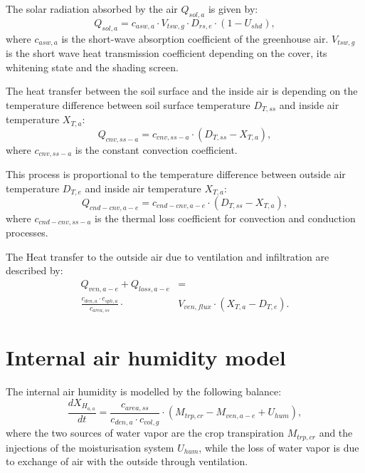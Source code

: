 The solar radiation absorbed by the air $Q_{sol,a}$ is given by:
\begin{equation}\label{eq:rs}
Q_{sol,a} = c_{asw,a} \cdot V_{tsw,g} \cdot D_{rs,e} \cdot \left( 1 - U_{shd} \right),
\end{equation}
where $c_{asw,a}$ is the short-wave absorption coefficient of the greenhouse air. $V_{tsw,g}$ is the short wave heat transmission coefficient depending on the cover, its whitening state and the shading screen.

The heat transfer between the soil surface and the inside air is depending on the temperature difference between soil surface temperature $D_{T,ss}$ and inside air temperature $X_{T,a}$:
\begin{equation}\label{eq:ss}
Q_{cnv,ss-a} = c_{cnv,ss-a} \cdot (D_{T,ss}-X_{T,a}),
\end{equation}
where $c_{cnv,ss-a}$ is the constant convection coefficient.

This process is proportional to the temperature difference between outside air temperature $D_{T,e}$ and inside air temperature $X_{T,a}$:
\begin{equation}\label{eq:a-e}
Q_{cnd-cnv,a-e} = c_{cnd-cnv,a-e} \cdot (D_{T,ss}-X_{T,a}),
\end{equation}
where $c_{cnd-cnv,ss-a}$ is the thermal loss coefficient for convection and conduction processes.

The Heat transfer to the outside air due to ventilation and infiltration are described by:
\begin{equation}\label{eq:loss}
\begin{split}
Q_{ven,a-e} + Q_{loss,a-e}& = \\
\frac{c_{den,a} \cdot c_{sph,a}}{c_{area,ss}} \cdot &V_{ven,flux} \cdot (X_{T,a}-D_{T,e}).
\end{split}
\end{equation}

\section{Internal air humidity model}
\label{sec:hum}
The internal air humidity is modelled by the following balance:
\begin{equation}\label{eq:hum}
\frac{dX_{H_{a,a}}}{dt} = \frac{c_{area,ss}}{c_{den,a} \cdot c_{vol,g}} \cdot \left(M_{trp,cr}-M_{ven,a-e}+U_{hum}\right),
\end{equation}
where the two sources of water vapor are the crop transpiration $M_{trp,cr}$ and the injections of the moisturisation system $U_{hum}$, while the loss of water vapor is due to exchange of air with the outside through ventilation.

